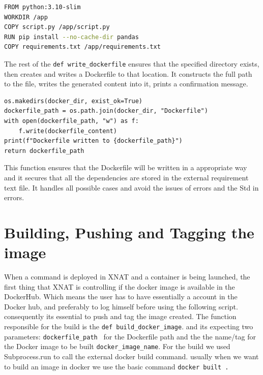 \begin{lstlisting}[language=bash,caption={Dockerfile}]
FROM python:3.10-slim
WORKDIR /app
COPY script.py /app/script.py
RUN pip install --no-cache-dir pandas
COPY requirements.txt /app/requirements.txt
\end{lstlisting}

The rest of the \texttt{def write\_dockerfile} ensures that the specified directory exists, then creates and writes a Dockerfile to that location. It constructs the full path to the file, writes the generated content into it, prints a confirmation message.



\begin{lstlisting}
os.makedirs(docker_dir, exist_ok=True)
dockerfile_path = os.path.join(docker_dir, "Dockerfile")
with open(dockerfile_path, "w") as f:
    f.write(dockerfile_content)
print(f"Dockerfile written to {dockerfile_path}")
return dockerfile_path
\end{lstlisting}

This function ensures that the Dockerfile will be written in a appropriate way and it secures that all the dependencies are stored in the external requirement text file. It handles all possible cases and avoid the issues of errors and the Std in errors. 

\section{Building, Pushing and Tagging the image}

When a command is deployed in XNAT and a container is being launched, the first thing that XNAT is controlling if the docker image is available in the DockerHub. Which means the user has to have essentially a account in the Docker hub, and preferably to log himself before using the following script. consequently its essential to push and tag the image created.
The function responsible for the build is the \texttt{def build\_docker\_image}. and its expecting two parameters: 
\texttt{dockerfile\_path } for the Dockerfile path and the the name/tag for the Docker image to be built \texttt{docker\_image\_name}. For the build we used Subprocess.run to call the external docker build command.
usually when we want to build an image in docker we use the basic command \texttt{docker built  .} 


